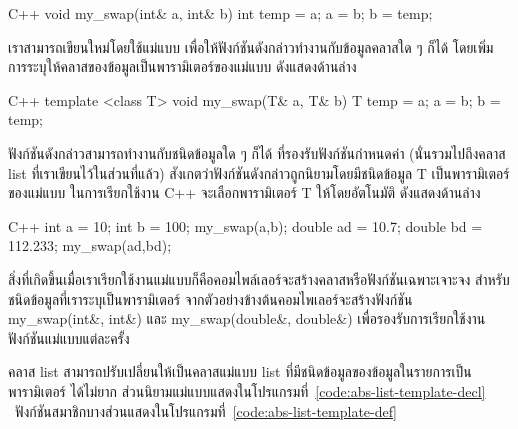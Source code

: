 \latintext
\begin{codelist}{C++}{}
void my_swap(int& a, int& b)
{
  int temp = a;  a = b;  b = temp;
}
\end{codelist}
\thaitext

เรา{\wbr}สามารถ{\wbr}เขียน{\wbr}ใหม่{\wbr}โดย{\wbr}ใช้{\wbr}แม่แบบ เพื่อให้{\wbr}ฟังก์ชัน{\wbr}ดังกล่าว{\wbr}ทำงาน{\wbr}กับ{\wbr}ข้อมูล{\wbr}ค{\wbr}ลา{\wbr}ส{\wbr}ใด ๆ ก็ได้{\wbr}
โดย{\wbr}เพิ่ม{\wbr}การ{\wbr}ระบุ{\wbr}ให้{\wbr}ค{\wbr}ลา{\wbr}ส{\wbr}ของ{\wbr}ข้อมูล{\wbr}เป็น{\wbr}พารามิเตอร์{\wbr}ของ{\wbr}แม่แบบ ดัง{\wbr}แสดง{\wbr}ด้าน{\wbr}ล่าง{\wbr}

\latintext
\begin{codelist}{C++}{}
template <class T> 
void my_swap(T& a, T& b)
{
  T temp = a;  a = b;  b = temp;
}
\end{codelist}
\thaitext

ฟังก์ชัน{\wbr}ดังกล่าว{\wbr}สามารถ{\wbr}ทำงาน{\wbr}กับ{\wbr}ชนิด{\wbr}ข้อมูล{\wbr}ใด ๆ ก็ได้ ที่{\wbr}รองรับ{\wbr}ฟังก์ชัน{\wbr}กำหนด{\wbr}ค่า{\wbr}
(นั่น{\wbr}รวม{\wbr}ไป{\wbr}ถึง{\wbr}ค{\wbr}ลา{\wbr}ส list ที่{\wbr}เรา{\wbr}เขียน{\wbr}ไว้{\wbr}ใน{\wbr}ส่วน{\wbr}ที่แล้ว)
สังเกต{\wbr}ว่า{\wbr}ฟังก์ชัน{\wbr}ดังกล่าว{\wbr}ถูก{\wbr}นิยาม{\wbr}โดย{\wbr}มี{\wbr}ชนิด{\wbr}ข้อมูล {\ct T} เป็น{\wbr}พารามิเตอร์{\wbr}ของ{\wbr}แม่แบบ{\wbr}
ใน{\wbr}การ{\wbr}เรียก{\wbr}ใช้{\wbr}งาน C++ จะ{\wbr}เลือก{\wbr}พารามิเตอร์ {\ct T} ให้{\wbr}โดย{\wbr}อัตโนมัติ ดัง{\wbr}แสดง{\wbr}ด้าน{\wbr}ล่าง{\wbr}

\latintext
\begin{codelist}{C++}{}
  int a = 10; int b = 100;
  my_swap(a,b);
  double ad = 10.7; double bd = 112.233;
  my_swap(ad,bd);
\end{codelist}
\thaitext

สิ่ง{\wbr}ที่{\wbr}เกิด{\wbr}ขึ้น{\wbr}เมื่อ{\wbr}เรา{\wbr}เรียก{\wbr}ใช้{\wbr}งาน{\wbr}แม่แบบ{\wbr}ก็{\wbr}คือ{\wbr}คอมไพล์{\wbr}เลอร์{\wbr}จะ{\wbr}สร้าง{\wbr}ค{\wbr}ลา{\wbr}ส{\wbr}หรือ{\wbr}ฟังก์ชัน{\wbr}เฉพาะเจาะจง{\wbr}
สำหรับ{\wbr}ชนิด{\wbr}ข้อมูล{\wbr}ที่{\wbr}เรา{\wbr}ระบุ{\wbr}เป็น{\wbr}พารามิเตอร์ จาก{\wbr}ตัวอย่าง{\wbr}ข้างต้น{\wbr}คอม{\wbr}ไพ{\wbr}เลอร์{\wbr}จะ{\wbr}สร้าง{\wbr}ฟังก์ชัน{\wbr}
{\ct my\_swap(int\&, int\&)} และ {\ct my\_swap(double\&, double\&)}
เพื่อ{\wbr}รองรับ{\wbr}การ{\wbr}เรียก{\wbr}ใช้{\wbr}งาน{\wbr}ฟังก์ชัน{\wbr}แม่แบบ{\wbr}แต่ละ{\wbr}ครั้ง{\wbr}

ค{\wbr}ลา{\wbr}ส {\ct list} สามารถ{\wbr}ปรับ{\wbr}เปลี่ยน{\wbr}ให้{\wbr}เป็น{\wbr}ค{\wbr}ลา{\wbr}ส{\wbr}แม่แบบ {\ct list}
ที่{\wbr}มี{\wbr}ชนิด{\wbr}ข้อมูล{\wbr}ของ{\wbr}ข้อมูล{\wbr}ใน{\wbr}รายการ{\wbr}เป็น{\wbr}พารามิเตอร์ ได้{\wbr}ไม่{\wbr}ยาก{\wbr}
ส่วน{\wbr}นิยาม{\wbr}แม่แบบ{\wbr}แสดง{\wbr}ใน{\wbr}โปรแกรม{\wbr}ที่~\ref{code:abs-list-template-decl}
\ ฟังก์ชัน{\wbr}สมาชิก{\wbr}บาง{\wbr}ส่วน{\wbr}แสดง{\wbr}ใน{\wbr}โปรแกรม{\wbr}ที่~\ref{code:abs-list-template-def}

